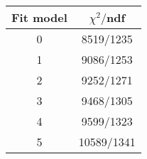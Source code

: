 \begin{tabular}{c|c}
Fit model & $\chi^2/$ndf \\
\hline
0 & 8519/1235\\
1 & 9086/1253\\
2 & 9252/1271\\
3 & 9468/1305\\
4 & 9599/1323\\
5 & 10589/1341\\
\end{tabular}
